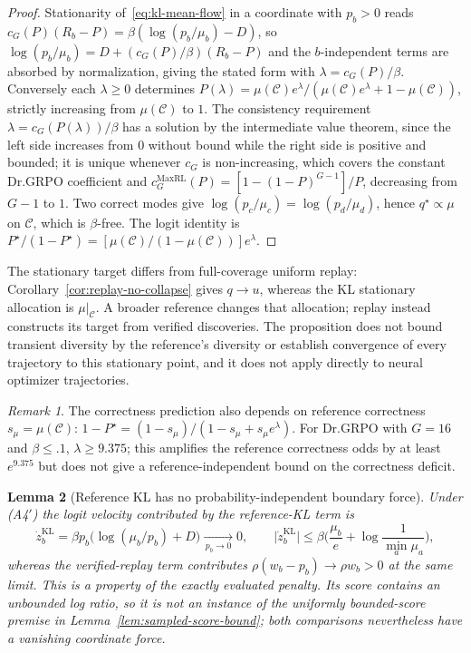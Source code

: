 \documentclass{article}
\newcommand{\1}{\mathbf 1}
\newtheorem{lemma}{Lemma}[section]
\theoremstyle{remark}
\newtheorem{remark}[lemma]{Remark}
\theoremstyle{definition}
\theoremstyle{plain}
\begin{document}
\begin{proof}
Stationarity of~\eqref{eq:kl-mean-flow} in a coordinate with $p_b>0$ reads
$c_G(P)(R_b-P)=\beta(\log(p_b/\mu_b)-D)$, so
$\log(p_b/\mu_b)=D+(c_G(P)/\beta)(R_b-P)$ and the $b$-independent terms are
absorbed by normalization, giving the stated form with $\lambda=c_G(P)/\beta$.
Conversely each $\lambda\ge0$ determines
$P(\lambda)=\mu(\mathcal C)e^\lambda/(\mu(\mathcal C)e^\lambda+1-\mu(\mathcal C))$,
strictly increasing from $\mu(\mathcal C)$ to $1$. The consistency requirement
$\lambda=c_G(P(\lambda))/\beta$ has a solution by the intermediate value
theorem, since the left side increases from $0$ without bound while the right
side is positive and bounded; it is unique whenever $c_G$ is non-increasing,
which covers the constant Dr.GRPO coefficient and
$c_G^{\mathrm{MaxRL}}(P)=[1-(1-P)^{G-1}]/P$, decreasing from $G-1$ to $1$.
Two correct modes give $\log(p_c/\mu_c)=\log(p_d/\mu_d)$, hence
$q^\star\propto\mu$ on $\mathcal C$, which is $\beta$-free. The logit identity
is $P^\star/(1-P^\star)=[\mu(\mathcal C)/(1-\mu(\mathcal C))]e^\lambda$.
\end{proof}

The stationary target differs from full-coverage uniform replay:
Corollary~\ref{cor:replay-no-collapse} gives $q\to u$, whereas the KL
stationary allocation is $\mu|_{\mathcal C}$. A broader reference changes that
allocation; replay instead constructs its target from verified discoveries.
The proposition does not bound transient diversity by the reference's
diversity or establish convergence of every trajectory to this stationary
point, and it does not apply directly to neural optimizer trajectories.

\begin{remark}
The correctness prediction also depends on reference correctness
$s_\mu=\mu(\mathcal C)$:
$1-P^\star=(1-s_\mu)/(1-s_\mu+s_\mu e^\lambda)$.
For Dr.GRPO with $G=16$ and $\beta\le.1$, $\lambda\ge9.375$;
this amplifies the reference correctness odds by at least $e^{9.375}$ but
does not give a reference-independent bound on the correctness deficit.
\end{remark}

\begin{lemma}[Reference KL has no probability-independent boundary force]
\label{lem:kl-boundary-force}
Under (A4$'$) the logit velocity contributed by the reference-KL term is
\[
  \dot z^{\mathrm{KL}}_b=\beta p_b\big(\log(\mu_b/p_b)+D\big)
  \xrightarrow[\,p_b\to0\,]{}0,
  \qquad
  \big|\dot z^{\mathrm{KL}}_b\big|
  \le\beta\Big(\frac{\mu_b}{e}+\log\frac1{\min_a\mu_a}\Big),
\]
whereas the verified-replay term contributes $\rho(w_b-p_b)\to\rho w_b>0$ at
the same limit. This is a property of the exactly evaluated penalty. Its score contains
an unbounded log ratio, so it is not an instance of the uniformly
bounded-score premise in Lemma~\ref{lem:sampled-score-bound}; both
comparisons nevertheless have a vanishing coordinate force.
\end{lemma}
\end{document}
